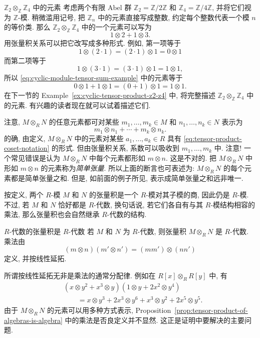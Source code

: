 \begin{Example}{$\mathbb{Z}_{2}\otimes_{\mathbb{Z}}\mathbb{Z}_{4}$ 中的元素}\leavevmode\label{ex:elements-of-cyclic-module-tensor-product}
考虑两个有限 Abel 群 $\mathbb{Z}_{2}=\mathbb{Z}/2\mathbb{Z}$ 和 $\mathbb{Z}_{4}=\mathbb{Z}/4\mathbb{Z}$, 并将它们视为 $\mathbb{Z}$-模. 稍微滥用记号, 把 $\mathbb{Z}_{n}$ 中的元素直接写成整数, 约定每个整数代表一个模 $n$ 的等价类. 那么 $\mathbb{Z}_{2}\otimes_{\mathbb{Z}}\mathbb{Z}_{4}$ 中的一个元素可以写为
\begin{equation}\label{eq:cyclic-module-tensor-sum-example}
  1\otimes2+1\otimes3.
\end{equation}
用张量积关系可以把它改写成多种形式. 例如, 第一项等于
\[
  1\otimes(2\cdot1)=(2\cdot1)\otimes1=0\otimes1
\]
而第二项等于
\[
  1\otimes(3\cdot1)=(3\cdot1)\otimes1=1\otimes1,
\]
所以 \eqref{eq:cyclic-module-tensor-sum-example} 中的元素等于
\[
  0\otimes1+1\otimes1=(0+1)\otimes1=1\otimes1.
\]
在下一节的 Example~\ref{ex:cyclic-tensor-product-z2-z4} 中, 将完整描述 $\mathbb{Z}_{2}\otimes_{\mathbb{Z}}\mathbb{Z}_{4}$ 中的元素. 有兴趣的读者现在就可以试着描述它们.
\end{Example}

注意, $M\otimes_{R}N$ 的任意元素都可对某些 $m_{1},\ldots,m_{k}\in M$ 和 $n_{1},\ldots,n_{k}\in N$ 表示为
\[
  m_{1}\otimes n_{1}+\cdots+m_{k}\otimes n_{k}.
\]
\BookPairedNote
  {的确, 由定义, $M\otimes_{R}N$ 中的元素对某些 $a_{1},\ldots,a_{k}\in R$ 具有 \eqref{eq:tensor-product-coset-notation} 的形式. 但由张量积关系, 系数可以吸收到 $m_{1},\ldots,m_{k}$ 中.}
  {注意! 一个常见错误是认为 $M\otimes_{R}N$ 中每个元素都形如 $m\otimes n$. 这是不对的.}
把 $M\otimes_{R}N$ 中形如 $m\otimes n$ 的元素称为\emph{简单张量}. 所以上面的断言也可表述为: $M\otimes_{R}N$ 的每个元素都是简单张量之和. 但是, 如前面的例子所见, 表示成简单张量之和远非唯一.

按定义, 两个 $R$-模 $M$ 和 $N$ 的张量积是一个 $R$-模对其子模的商, 因此仍是 $R$-模. 不过, 若 $M$ 和 $N$ 恰好都是 $R$-代数, 换句话说, 若它们各自有与其 $R$-模结构相容的乘法, 那么张量积也会自然继承 $R$-代数的结构.

\begin{Proposition}{$R$-代数的张量积是 $R$-代数}\leavevmode\label{prop:tensor-product-of-algebras-is-algebra}
若 $M$ 和 $N$ 为 $R$-代数, 则张量积 $M\otimes_{R}N$ 是 $R$-代数. 乘法由
\[
  (m\otimes n)(m'\otimes n')=(mm')\otimes(nn')
\]
定义, 并按线性延拓.
\end{Proposition}

所谓\textquotedbl{}按线性延拓\textquotedbl{}无非是乘法的通常分配律. 例如在 $R[x]\otimes_{R}R[y]$ 中, 有
\[
  \begin{aligned}
    &(x\otimes y^{2}+x^{3}\otimes y)(1\otimes y+2x^{2}\otimes y^{4})\\
    &\qquad=x\otimes y^{3}+2x^{3}\otimes y^{6}+x^{3}\otimes y^{2}
      +2x^{5}\otimes y^{5}.
  \end{aligned}
\]
由于 $M\otimes_{R}N$ 的元素可以用多种方式表示, Proposition~\ref{prop:tensor-product-of-algebras-is-algebra} 中的乘法是否良定义并不显然. 这正是证明中要解决的主要问题.

